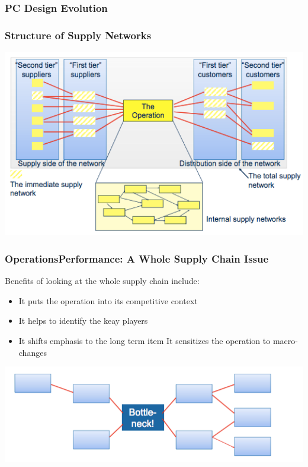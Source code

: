 \subsubsection{PC Design Evolution}
\subsubsection{Structure of Supply Networks}
\includegraphics[width=1\textwidth]{W06/structureofsupplynetwork}	
\subsubsection{OperationsPerformance: A Whole Supply Chain Issue}
Benefits of looking at the whole supply chain include:
\begin{itemize}
	\item It puts the operation into its competitive context
	\item It helps to identify the keay players
	\item It shifts emphasis to the long term
	item It sensitizes the operation to macro-changes
\end{itemize}
\includegraphics[width=1\textwidth]{W06/supplychainissue}	
